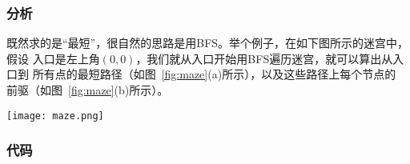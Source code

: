 \subsubsection{分析}
既然求的是“最短”，很自然的思路是用BFS。举个例子，在如下图所示的迷宫中，假设
入口是左上角$(0,0)$，我们就从入口开始用BFS遍历迷宫，就可以算出从入口到
所有点的最短路径（如图~\ref{fig:maze}(a)所示），以及这些路径上每个节点的
前驱（如图~\ref{fig:maze}(b)所示）。

\begin{center}
\texttt{[image: maze.png]}\\
\label{fig:maze}
\end{center}

\subsubsection{代码}

